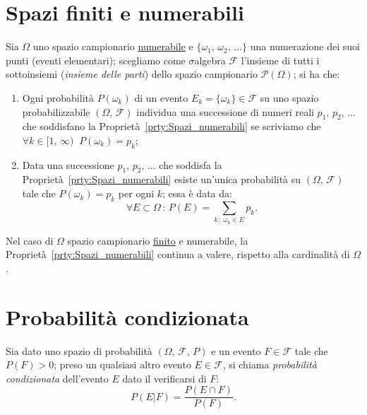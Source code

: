     \section{Spazi finiti e numerabili}
    \begin{prty}\label{prty:Spazi_numerabili}
        Sia $\Omega$ uno spazio campionario \underline{numerabile} e  $\{\omega_1,\,\omega_2,\,\ldots\}$ una numera\-zione dei suoi punti (eventi elementari); scegliamo come $\sigma$\nbdash algebra  $\mathscr{F}$ l'insieme di tutti i sottoinsiemi (\textit{insieme delle parti}) dello spazio campionario  $\mathscr{P}(\Omega)$; si ha che:
            \begin{enumerate}
                \item Ogni probabilità $P({\omega_k})$ di un evento $E_k = \{\omega_k\} \in \mathscr{F}$ su uno spazio probabiliz\-zabile $(\Omega,\,\mathscr{F})$ individua una successione di numeri reali $p_1,\,p_2,\,\ldots$ che soddisfano la Proprietà~\ref{prty:Spazi_numerabili} se scriviamo che $\forall k \in [1,\,\infty)\,\:\,P({\omega_k}) = p_k$;
                \item Data una successione $p_1,\,p_2,\,\ldots$ che soddisfa la Proprietà~\ref{prty:Spazi_numerabili} esiste un'unica probabilità su $(\Omega,\,\mathscr{F})$ tale che  $P({\omega_k}) = p_k$ per ogni  $k$; essa è data da: \[
                        \forall E \subset \Omega\,:\,P(E) = \sum_{k\,:\,\omega_k \in E} p_k
                .\] 
            \end{enumerate}
        \end{prty}
        \begin{obsv}
            Nel caso di $\Omega$ spazio campionario \underline{finito} e numerabile, la Proprietà~\ref{prty:Spazi_numerabili} continua a valere, rispetto alla cardinalità di $\Omega$.
        \end{obsv}
    \section{Probabilità condizionata}
    \begin{defn}\label{defn:Probabilità_condizionata}
            Sia dato uno spazio di probabilità $(\Omega,\,\mathscr{F},\,P)$ e un evento $F \in \mathscr{F}$ tale che $P(F) > 0$; preso un qualsiasi altro evento $E \in \mathscr{F}$, si chiama \textit{probabilità condizionata} dell'evento $E$ dato il verificarsi di $F$:
            \begin{equation}\label{eq:Formula_probabilità_condizionata}
                P(E|F) = \frac{P(E \cap F)}{P(F)}
            .
            \end{equation}
        \end{defn}
